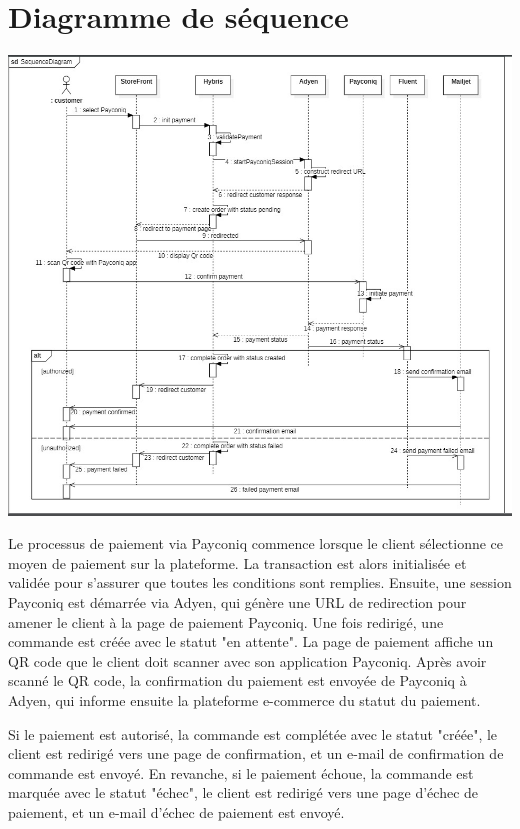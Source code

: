 \section{Diagramme de séquence}

\begin{center}
    \centering
    \includegraphics[width=19cm]{Figures/sequence.png}
    \label{fig:processus}
\end{center} 


Le processus de paiement via Payconiq commence lorsque le client sélectionne ce moyen de paiement sur la plateforme. La transaction est alors initialisée et validée pour s'assurer que toutes les conditions sont remplies. Ensuite, une session Payconiq est démarrée via Adyen, qui génère une URL de redirection pour amener le client à la page de paiement Payconiq. Une fois redirigé, une commande est créée avec le statut "en attente". La page de paiement affiche un QR code que le client doit scanner avec son application Payconiq. Après avoir scanné le QR code, la confirmation du paiement est envoyée de Payconiq à Adyen, qui informe ensuite la plateforme e-commerce du statut du paiement.

Si le paiement est autorisé, la commande est complétée avec le statut "créée", le client est redirigé vers une page de confirmation, et un e-mail de confirmation de commande est envoyé. En revanche, si le paiement échoue, la commande est marquée avec le statut "échec", le client est redirigé vers une page d'échec de paiement, et un e-mail d'échec de paiement est envoyé.



